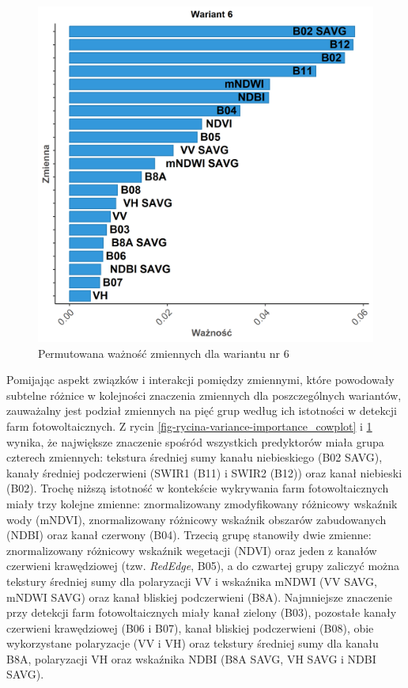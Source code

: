 \documentclass{amuthesis}
\begin{document}
\begin{figure}[t]

{\centering \includegraphics[width=4.6875in,height=\textheight]{figures/importance_plot_dataset6_pl.png}

}

\caption{\label{fig-rycina-variance-importance-dataset6}Permutowana
ważność zmiennych dla wariantu nr 6}

\end{figure}

Pomijając aspekt związków i interakcji pomiędzy zmiennymi, które
powodowały subtelne różnice w kolejności znaczenia zmiennych dla
poszczególnych wariantów, zauważalny jest podział zmiennych na pięć grup
według ich istotności w detekcji farm fotowoltaicznych. Z rycin
\ref{fig-rycina-variance-importance_cowplot} i
\ref{fig-rycina-variance-importance-dataset6} wynika, że największe
znaczenie spośród wszystkich predyktorów miała grupa czterech zmiennych:
tekstura średniej sumy kanału niebieskiego (B02 SAVG), kanały średniej
podczerwieni (SWIR1 (B11) i SWIR2 (B12)) oraz kanał niebieski (B02).
Trochę niższą istotność w kontekście wykrywania farm fotowoltaicznych
miały trzy kolejne zmienne: znormalizowany zmodyfikowany różnicowy
wskaźnik wody (mNDVI), znormalizowany różnicowy wskaźnik obszarów
zabudowanych (NDBI) oraz kanał czerwony (B04). Trzecią grupę stanowiły
dwie zmienne: znormalizowany różnicowy wskaźnik wegetacji (NDVI) oraz
jeden z kanałów czerwieni krawędziowej (tzw. \emph{RedEdge}, B05), a do
czwartej grupy zaliczyć można tekstury średniej sumy dla polaryzacji VV
i wskaźnika mNDWI (VV SAVG, mNDWI SAVG) oraz kanał bliskiej podczerwieni
(B8A). Najmniejsze znaczenie przy detekcji farm fotowoltaicznych miały
kanał zielony (B03), pozostałe kanały czerwieni krawędziowej (B06 i
B07), kanał bliskiej podczerwieni (B08), obie wykorzystane polaryzacje
(VV i VH) oraz tekstury średniej sumy dla kanału B8A, polaryzacji VH
oraz wskaźnika NDBI (B8A SAVG, VH SAVG i NDBI SAVG).
\end{document}
